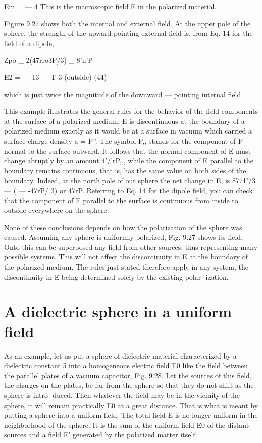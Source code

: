 \begin{equation}
\end{equation}
Em =  ---  4%
This is the macroscopic field E in the polarized material.

Figure 9.27 shows both the internal and external field. At the
upper pole of the sphere, the strength of the upward-pointing external
field is, from Eq. 14 for the field of a dipole,

\begin{equation}
\end{equation}
Zpo _ 2(47rro3P/3) _ 8'n'P

E2 =  --- 13 ---  T 3 (outside) (44)

which is just twice the magnitude of the downward --- pointing internal
field.

This example illustrates the general rules for the behavior of the
field components at the surface of a polarized medium. E is discontinuous
at the boundary of a polarized medium exactly as it
would be at a surface in vacuum which carried a surface charge
density a = P''. The symbol P,, stands for the component of P
normal to the surface outward. It follows that the normal component
of E must change abruptly by an amount 4'/'rP,,, while the
component of E parallel to the boundary remains continuous, that
is, has the same value on both sides of the boundary. Indeed, at the
north pole of our sphere the net change in E, is 8771'/3  ---  ( --- -47rP/ 3)
or 47rP. Referring to Eq. 14 for the dipole field, you can check that
the component of E parallel to the surface is continuous from inside
to outside everywhere on the sphere.

None of these conclusions depends on how the polarization of
the sphere was caused. Assuming any sphere is uniformly polarized,
Fig. 9.27 shows its field. Onto this can be superposed any field from
other sources, thus representing many possible systems. This will
not affect the discontinuity in E at the boundary of the polarized
medium. The rules just stated therefore apply in any system, the
discontinuity in E being determined solely by the existing polar-
ization.

\section{A dielectric sphere in a uniform field}

As an example, let us put a sphere of dielectric material characterized
by a dielectric constant 5 into a homogeneous electric field E0
like the field between the parallel plates of a vacuum capacitor,
Fig. 9.28. Let the sources of this field, the charges on the plates,
be far from the sphere so that they do not shift as the sphere is intro-
duced. Then whatever the field may be in the vicinity of the sphere,
it will remain practically E0 at a great distance. That is what is meant
by putting a sphere into a uniform field. The total field E is no
longer uniform in the neighborhood of the sphere. It is the sum of
the uniform field E0 of the distant sources and a field E' generated
by the polarized matter itself:


